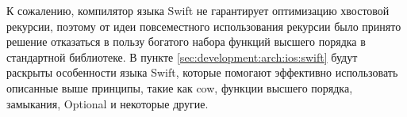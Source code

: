 К сожалению, компилятор языка Swift не гарантирует оптимизацию хвостовой рекурсии, поэтому от идеи повсеместного использования рекурсии было принято решение отказаться в пользу богатого набора функций высшего порядка в стандартной библиотеке. В пункте \ref{sec:development:arch:ios:swift} будут раскрыты особенности языка Swift, которые помогают эффективно использовать описанные выше принципы, такие как \gls{cow}, функции высшего порядка, замыкания, Optional и некоторые другие.